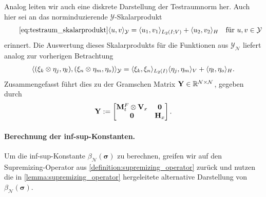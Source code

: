 \documentclass[../main.tex]{subfiles}
\begin{document}
Analog leiten wir auch eine diskrete Darstellung der Testraumnorm her.
Auch hier sei an das norminduzierende $\mathcal Y$-Skalarprodukt
\begin{equation}
    \tag*{\cref{eq:testraum_skalarprodukt}}
    \skp{u}{v}{\mathcal Y} = \skp{u_{1}}{v_{1}}{L_2(I; V)} + \skp{u_{2}}{v_{2}}{H} \quad \text{für } u, v \in \mathcal Y
\end{equation}
erinnert.
Die Auswertung dieses Skalarprodukts für die Funktionen aus $\mathcal Y_{\mathcal N}$ liefert analog zur vorherigen Betrachtung
\begin{align}
    \langle(\xi_{k} \otimes \eta_{j}, \eta_{l}),(\xi_{n} \otimes \eta_{m}, \eta_{o})\rangle_{\mathcal Y}
    = \langle\xi_{k},\xi_{n}\rangle_{L_{2}(I)} \langle\eta_{j},\eta_{m}\rangle_{V} + \langle\eta_{l},\eta_{o}\rangle_{H}.
\end{align}
Zusammengefasst führt dies zu der Gramschen Matrix $\mathbf{Y} \in \mathbb{R}^{\mathcal N \times \mathcal N}$, gegeben durch
\begin{equation}
    \mathbf{Y} := \begin{bmatrix}
    \mathbf{M}_{t}^{F} \otimes \mathbf{V}_{x} & \mathbf{0}\\
    \mathbf{0} & \mathbf{H}_{x}
    \end{bmatrix}.
\end{equation}


\paragraph{Berechnung der inf-sup-Konstanten.} %
\label{par:berechnung_der_inf_sup_konstante}

Um die inf-sup-Konstante $\beta_{\mathcal N}(\bm \sigma)$ zu berechnen, greifen wir auf den Supremizing-Operator aus \cref{definition:supremizing_operator} zurück und nutzen die in \cref{lemma:supremizing_operator} hergeleitete alternative Darstellung von $\beta_{\mathcal N}(\bm \sigma)$.
\end{document}
